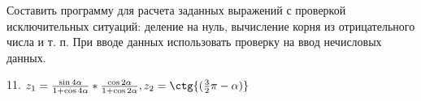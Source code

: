 Составить программу для расчета заданных выражений с проверкой исключительных 
ситуаций: деление на нуль, вычисление корня из отрицательного числа и т. п. 
При вводе данных использовать проверку на ввод нечисловых данных.

11.
$ 
	z_1 = \frac{\sin{4\alpha}}{1+\cos{4\alpha}}*\frac{\cos{2\alpha}}{1+\cos{2\alpha}}, 
	z_2 = \ctg{(\frac{3}{2}\pi - \alpha)}
$
